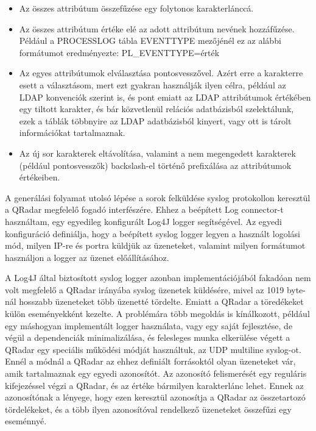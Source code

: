 \begin{itemize}
	\item Az összes attribútum összefűzése egy folytonos karakterlánccá.
	
	\item Az összes attribútum értéke elé az adott attribútum nevének hozzáfűzése. Például a PROCESSLOG tábla EVENTTYPE mezőjénél ez az alábbi formátumot eredményezte: PL\_EVENTTYPE={érték}
	
	\item Az egyes attribútumok elválasztása pontosvesszővel. Azért erre a karakterre esett a választásom, mert ezt gyakran használják ilyen célra, például az LDAP konvenciók szerint is, és pont emiatt az LDAP attribútumok értékében egy tiltott karakter, és bár közvetlenül relációs adatbázisból szelektálunk, ezek a táblák többnyire az LDAP adatbázisból kinyert, vagy ott is tárolt információkat tartalmaznak.
	
	\item Az új sor karakterek eltávolítása, valamint a nem megengedett karakterek (például pontosvesszők) backslash-el történő prefixálása az attribútumok értékeiben.
\end{itemize} 




A generálási folyamat utolsó lépése a sorok felküldése syslog protokollon keresztül a QRadar megfelelő fogadó interfészére. Ehhez a beépített Log connector-t használtam, egy egyedileg konfigurált Log4J logger segítségével. Az egyedi konfiguráció definiálja, hogy a beépített syslog logger legyen a használt logolási mód, milyen IP-re és portra küldjük az üzeneteket, valamint milyen formátumot használjon a logger az üzenet előállításához.

A Log4J által biztosított syslog logger azonban implementációjából fakadóan nem volt megfelelő a QRadar irányába syslog üzenetek küldésére, mivel az 1019 byte-nál hosszabb üzeneteket több üzenetté tördelte. Emiatt a QRadar a töredékeket külön eseményekként kezelte. A problémára több megoldás is kínálkozott, például egy máshogyan implementált logger használata, vagy egy saját fejlesztése, de végül a dependenciák minimalizálása, és felesleges munka elkerülése végett a QRadar egy speciális működési módját használtuk, az UDP multiline syslog-ot.\cite{multilnesyslog} Ennél a módnál a QRadar az ehhez definiált forrásoktól olyan üzeneteket vár, amik tartalmaznak egy egyedi azonosítót. Az azonosító felismerését egy reguláris kifejezéssel végzi a QRadar, és az értéke bármilyen karakterlánc lehet. Ennek az azonosítónak a lényege, hogy ezen keresztül azonosítja a QRadar az összetartozó tördelékeket, és a több ilyen azonosítóval rendelkező üzeneteket összefűzi egy eseménnyé.

